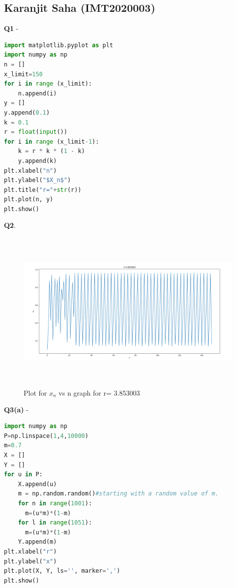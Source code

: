 \documentclass[11pt]{scrartcl} %
\begin{document}
\subsection{Karanjit Saha (IMT2020003)}
\textbf{Q1} -
\begin{lstlisting}[language=Python, caption= Code for plotting $X_n$ vs n graph for a given r]
import matplotlib.pyplot as plt
import numpy as np
n = []
x_limit=150
for i in range (x_limit):
    n.append(i)
y = []
y.append(0.1)
k = 0.1
r = float(input())
for i in range (x_limit-1):
    k = r * k * (1 - k)
    y.append(k)
plt.xlabel("n")
plt.ylabel("$X_n$")
plt.title("r="+str(r))
plt.plot(n, y)
plt.show() 
\end{lstlisting}
\textbf{Q2}.
\begin{figure}[h] %
	\centering
	\includegraphics[width=12cm, height=8cm]{Karanjit.png} %
	\caption {Plot for $x_n$ vs n graph for r= 3.853003}
\end{figure}
\newpage
\textbf{Q3(a)} -
\begin{lstlisting}[language=Python, caption= Bifurcation diagram]
import numpy as np
P=np.linspace(1,4,10000)
m=0.7
X = []
Y = []
for u in P:
    X.append(u)
    m = np.random.random()#starting with a random value of m.
    for n in range(1001):
      m=(u*m)*(1-m)
    for l in range(1051):
      m=(u*m)*(1-m)
    Y.append(m)
plt.xlabel("r")
plt.ylabel("x")
plt.plot(X, Y, ls='', marker=',')
plt.show()
\end{lstlisting}
\newpage
\end{document}
